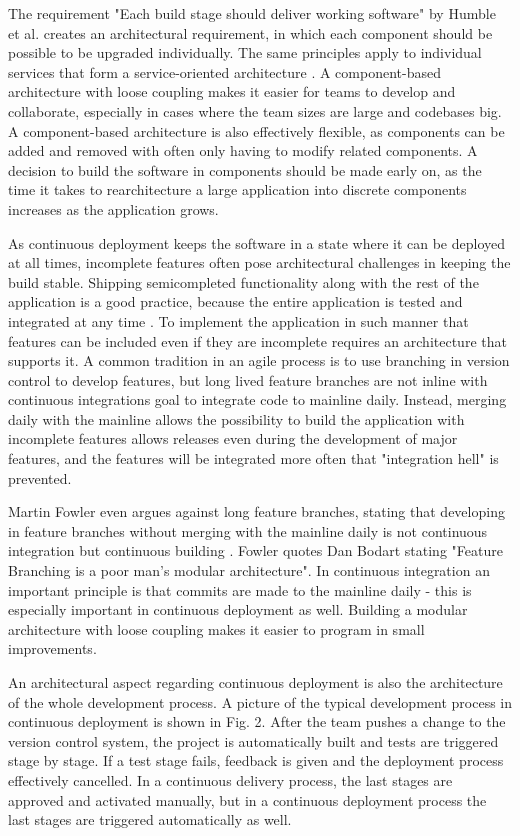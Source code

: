 \documentclass[conference]{IEEEtran}
\begin{document}
The requirement "Each build stage should deliver working software" by Humble et al. \cite{humble2006deployment} creates an architectural requirement, in which each component should be possible to be upgraded individually. The same principles apply to individual services that form a service-oriented architecture \cite{cdbook}. A component-based architecture with loose coupling makes it easier for teams to develop and collaborate, especially in cases where the team sizes are large and codebases big. A component-based architecture is also effectively flexible, as components can be added and removed with often only having to modify related components. A decision to build the software in components should be made early on, as the time it takes to rearchitecture a large application into discrete components increases as the application grows. 

As continuous deployment keeps the software in a state where it can be deployed at all times, incomplete features often pose architectural challenges in keeping the build stable. Shipping semicompleted functionality along with the rest of the application is a good practice, because the entire application is tested and integrated at any time \cite{cdbook}. To implement the application in such manner that features can be included even if they are incomplete requires an architecture that supports it. A common tradition in an agile process is to use branching in version control to develop features, but long lived feature branches are not inline with continuous integrations goal to integrate code to mainline daily. Instead, merging daily with the mainline allows the possibility to build the application with incomplete features allows releases even during the development of major features, and the features will be integrated more often that "integration hell" is prevented.

Martin Fowler even argues against long feature branches, stating that developing in feature branches without merging with the mainline daily is not continuous integration but continuous building \cite{mf}. Fowler quotes Dan Bodart stating "Feature Branching is a poor man's modular architecture". In continuous integration an important principle is that commits are made to the mainline daily - this is especially important in continuous deployment as well. Building a modular architecture with loose coupling makes it easier to program in small improvements.

An architectural aspect regarding continuous deployment is also the architecture of the whole development process. A picture of the typical development process in continuous deployment is shown in Fig. 2. After the team pushes a change to the version control system, the project is automatically built and tests are triggered stage by stage. If a test stage fails, feedback is given and the deployment process effectively cancelled. In a continuous delivery process, the last stages are approved and activated manually, but in a continuous deployment process the last stages are triggered automatically as well.
\end{document}
